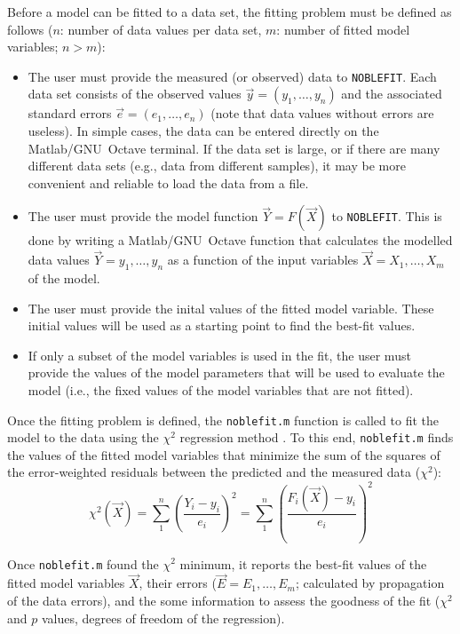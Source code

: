 \documentclass[12pt]{article}
\newcommand{\noblefit}{{\tt NOBLEFIT}}
\begin{document}
Before a model can be fitted to a data set, the fitting problem must be defined as follows ($n$: number of data values per data set, $m$: number of fitted model variables; $ n > m$):
\begin{itemize}
\item The user must provide the measured (or observed) data to \noblefit. Each data set consists of the observed values $\vec{y} = (y_1, \ldots, y_n)$ and the associated standard errors $\vec{e} = (e_1, \ldots, e_n)$ (note that data values without errors are useless). In simple cases, the data can be entered directly on the Matlab/\mbox{GNU Octave} terminal. If the data set is large, or if there are many different data sets (e.g., data from different samples), it may be more convenient and reliable to load the data from a file.
\item The user must provide the model function $\vec{Y} = F(\vec{X})$ to \noblefit. This is done by writing a Matlab/\mbox{GNU Octave} function that calculates the modelled data values $\vec{Y} = y_1, \ldots, y_n$ as a function of the input variables $\vec{X} = X_1, \ldots, X_m$ of the model.
\item The user must provide the inital values of the fitted model variable. These initial values will be used as a starting point to find the best-fit values.
\item If only a subset of the model variables is used in the fit, the user must provide the values of the model parameters that will be used to evaluate the model (i.e., the fixed values of the model variables that are not fitted).
\end{itemize}

Once the fitting problem is defined, the {\tt noblefit.m} function is called to fit the model to the data using the $\chi^2$ regression method \citep{Press:1986}. To this end, {\tt noblefit.m} finds the values of the fitted model variables that minimize the sum of the squares of the error-weighted residuals between the predicted and the measured data ($\chi^2$):
\begin{displaymath}
\chi^2(\vec{X}) = \sum_1^n \left(\frac{Y_i - y_i}{e_i}\right)^2 = \sum_1^n \left(\frac{F_i(\vec{X}) - y_i}{e_i}\right)^2
\end{displaymath}

Once {\tt noblefit.m} found the $\chi^2$ minimum, it reports the best-fit values of the fitted model variables $\vec{X}$, their errors ($\vec{E} = E_1,\ldots,E_m$; calculated by propagation of the data errors), and the some information to assess the goodness of the fit ($\chi^2$ and $p$ values, degrees of freedom of the regression).\par
\end{document}
